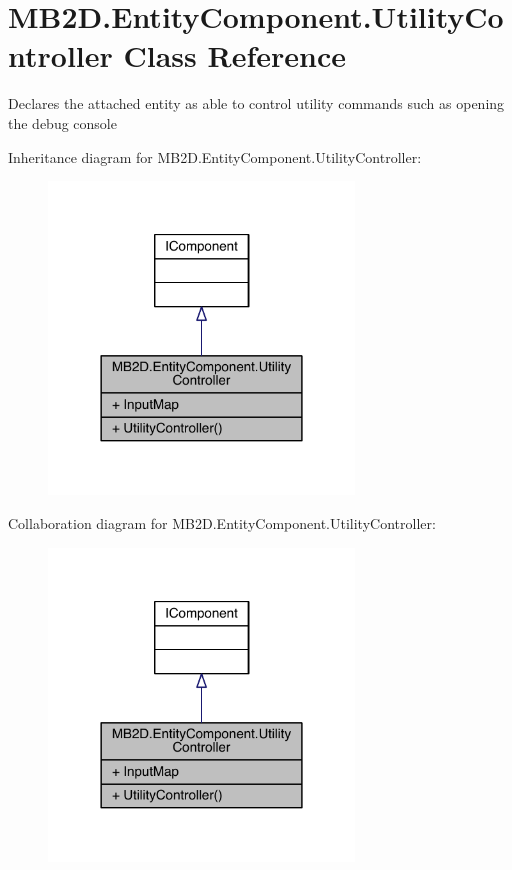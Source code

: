 \hypertarget{class_m_b2_d_1_1_entity_component_1_1_utility_controller}{}\section{M\+B2\+D.\+Entity\+Component.\+Utility\+Controller Class Reference}
\label{class_m_b2_d_1_1_entity_component_1_1_utility_controller}


Declares the attached entity as able to control utility commands such as opening the debug console  




Inheritance diagram for M\+B2\+D.\+Entity\+Component.\+Utility\+Controller\+:
\nopagebreak
\begin{figure}[H]
\begin{center}
\leavevmode
\includegraphics[width=230pt]{class_m_b2_d_1_1_entity_component_1_1_utility_controller__inherit__graph}
\end{center}
\end{figure}


Collaboration diagram for M\+B2\+D.\+Entity\+Component.\+Utility\+Controller\+:
\nopagebreak
\begin{figure}[H]
\begin{center}
\leavevmode
\includegraphics[width=230pt]{class_m_b2_d_1_1_entity_component_1_1_utility_controller__coll__graph}
\end{center}
\end{figure}
